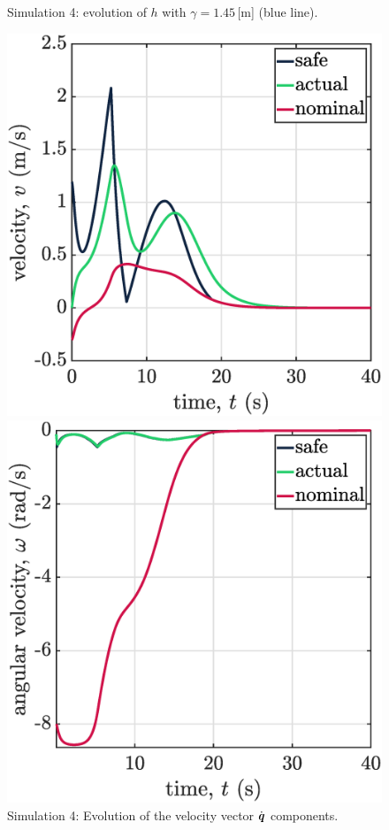 \begin{figure}[!ht]
\begin{minipage}[b]{0.46\linewidth}
    \caption{\label{fig:sim4h}Simulation 4: evolution of $h$ with $\gamma = 1.45\,[\mathrm{m}$] (blue line).}
    \end{minipage}   
\begin{minipage}[t]{.45\textwidth}
        \centering
        \includegraphics[width=\textwidth]{figures/sim4v1.eps}
    \end{minipage}
    \hfill
    \begin{minipage}[t]{.45\textwidth}
        \centering
        \includegraphics[width=\textwidth]{figures/sim4v2.eps}
    \end{minipage}  
    \caption{\label{fig:sim4v}Simulation 4: Evolution of the velocity vector $\dot{\boldsymbol{q}}$ components.}
    

\end{figure}
